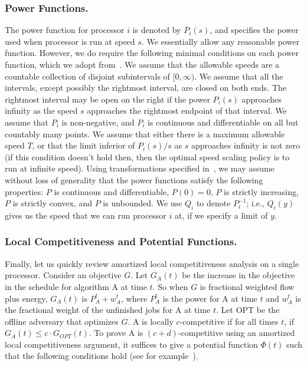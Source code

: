 \documentclass[11pt]{article}
\begin{document}
\subsubsection{Power Functions.}
The power function for processor $i$ is denoted by $P_i(s)$, and
specifies the power used when processor is run at speed $s$. We
essentially allow any reasonable power function.  However, we do require
the following minimal conditions on each power function, which we adopt
from~\cite{BCP}.  We assume that the allowable speeds are a countable
collection of disjoint subintervals of $[0, \infty)$. We assume that all
the intervals, except possibly the rightmost interval, are closed on
both ends. The rightmost interval may be open on the right if the power
$P_i(s)$ approaches infinity as the speed $s$ approaches the rightmost
endpoint of that interval.  We assume that $P_i$ is non-negative, and
$P_i$ is continuous and differentiable on all but countably many points.
We assume that either there is a maximum allowable speed $T$, or that
the limit inferior of $P_i(s)/s$ as $s$ approaches infinity is not zero
(if this condition doesn't hold then, then the optimal speed scaling
policy is to run at infinite speed). Using transformations specified
in~\cite{BCP}, we may assume without loss of generality that the power
functions satisfy the following properties:
$P$ is continuous and differentiable,
$P(0)=0$, $P$ is strictly increasing,
$P$ is strictly convex, and  $P$ is unbounded.
We use $Q_i$ to denote $P_i^{-1}$; i.e., $Q_i(y)$ gives us the speed
that we can run processor $i$ at, if we specify a limit of $y$.


\subsubsection{Local Competitiveness and Potential Functions.}
Finally, let us quickly review amortized local competitiveness analysis
on a single processor.
Consider an objective $G$. Let $G_A(t)$ be the increase in the objective
in the schedule for algorithm A at time $t$.  So when $G$ is fractional weighted flow
plus energy, $G_A(t)$ is $P_A^t + w_A^t$, where $P_A^t$ is the power
for A at time $t$ and $w_A^t$ is the fractional weight of the unfinished jobs for A at
time $t$.
Let
OPT be the offline adversary that optimizes $G$.
A is locally $c$-competitive if for all times $t$, if
$G_{A}(t) \le c \cdot G_{OPT}(t)$.
To prove A is $(c+d)$-competitive using an amortized local competitiveness argument,
it suffices to give a potential function
$\Phi(t)$ such that the following conditions hold (see for example~\cite{Pruhs07}).
\end{document}
